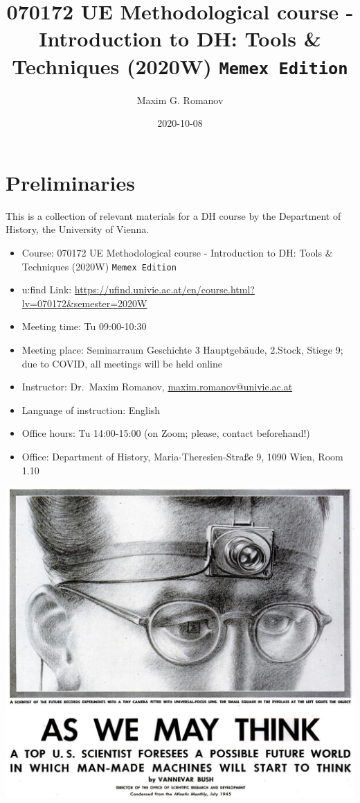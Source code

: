\documentclass[
]{book}
\title{070172 UE Methodological course - Introduction to DH: Tools \& Techniques (2020W) \texttt{Memex\ Edition}}
\author{Maxim G. Romanov}
\date{2020-10-08}
\providecommand{\tightlist}{%
  \setlength{\itemsep}{0pt}\setlength{\parskip}{0pt}}
\begin{document}
\maketitle

{
\setcounter{tocdepth}{1}
\tableofcontents
}
\hypertarget{preliminaries}{%
\chapter*{Preliminaries}\label{preliminaries}}

This is a collection of relevant materials for a DH course by the Department of History, the University of Vienna.

\begin{itemize}
\tightlist
\item
  Course: 070172 UE Methodological course - Introduction to DH: Tools \& Techniques (2020W) \texttt{Memex\ Edition}
\item
  u:find Link: \url{https://ufind.univie.ac.at/en/course.html?lv=070172\&semester=2020W}
\item
  Meeting time: Tu 09:00-10:30
\item
  Meeting place: Seminarraum Geschichte 3 Hauptgebäude, 2.Stock, Stiege 9; due to COVID, all meetings will be held online
\item
  Instructor: Dr.~Maxim Romanov, \url{maxim.romanov@univie.ac.at}
\item
  Language of instruction: English
\item
  Office hours: Tu 14:00-15:00 (on Zoom; please, contact beforehand!)
\item
  Office: Department of History, Maria-Theresien-Straße 9, 1090 Wien, Room 1.10
\end{itemize}

\includegraphics{./images/memex01.jpg}
\end{document}
